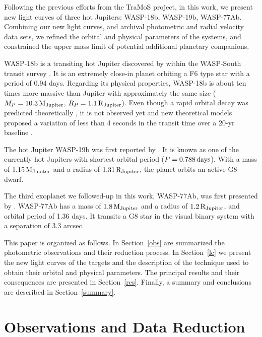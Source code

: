 Following the previous efforts from the TraMoS project, in this work, we present new light curves of three hot Jupiters: WASP-18b, WASP-19b, WASP-77Ab. Combining our new light curves, and archival photometric and radial velocity data sets, we refined the orbital and physical parameters of the systems, and constrained the upper mass limit of potential additional planetary companions. 

WASP-18b is a transiting hot Jupiter discovered by \citet{Hellier2009} within the WASP-South transit survey \citep{Pollacco2006}. It is an extremely close-in planet orbiting a F6 type star with a period of 0.94 days. Regarding its physical properties, WASP-18b is about ten times more massive than Jupiter with approximately the same size ($M_{P}=10.3\,{\rm M_{Jupiter}}$, $R_{P}=1.1\,{\rm R_{Jupiter}}$). Even though a rapid orbital decay was predicted theoretically \citep{Hellier2009}, it is not observed yet \citep{Wilkins2017} and new theoretical models proposed a variation of less than 4 seconds in the transit time over a 20-yr baseline \citep{CollierCameron2018}.

The hot Jupiter WASP-19b was first reported by \cite{Hebb2010}. It is known as one of the currently hot Jupiters with shortest orbital period ($P=0.788\,{\rm days}$). With a mass of $1.15\,{\rm M_{Jupiter}}$ and a radius of $1.31\,{\rm R_{Jupiter}}$, the planet orbits an active G8 dwarf.

The third exoplanet we followed-up in this work, WASP-77Ab, was first presented by \cite{Maxted2013}. WASP-77Ab has a mass of $1.8\,{\rm M_{Jupiter}}$ and a radius of $1.2\,{\rm R_{Jupiter}}$, and orbital period of 1.36 days. It transits a G8 star in the visual binary system with a separation of 3.3 arcsec.

This paper is organized as follows. In Section~\ref{obs} are summarized the photometric observations and their reduction process. In Section~\ref{lc} we present the new light curves of the targets and the description of the technique used to obtain their orbital and physical parameters. The principal results and their consequences are presented in Section~\ref{res}. Finally, a summary and conclusions are described in Section~\ref{summary}.


\section{Observations and Data Reduction}


